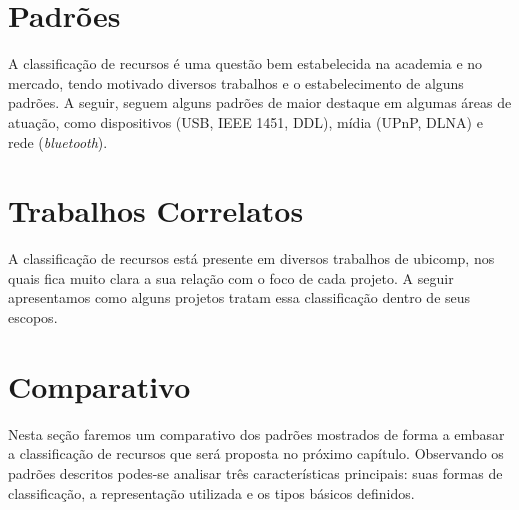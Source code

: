 \section{Padrões}
\label{sec:padroes}

A classificação de recursos é uma questão bem estabelecida na academia e no mercado, tendo motivado diversos trabalhos e o estabelecimento de alguns padrões. A seguir, seguem alguns padrões de maior destaque em algumas áreas de atuação, como dispositivos (USB, IEEE 1451, DDL), mídia (UPnP, DLNA) e rede (\emph{bluetooth}).








\section{Trabalhos Correlatos}
\label{sec:correlatos}

A classificação de recursos está presente em diversos trabalhos de ubicomp, nos quais fica muito clara a sua relação com o foco de cada projeto. A seguir apresentamos como alguns projetos tratam essa classificação dentro de seus escopos.






\section{Comparativo}
\label{sec:comparativo}

Nesta seção faremos um comparativo dos padrões mostrados de forma a embasar a classificação de recursos que será proposta no próximo capítulo. Observando os padrões descritos podes-se analisar três características principais: suas formas de classificação, a representação utilizada e os tipos básicos definidos. 

